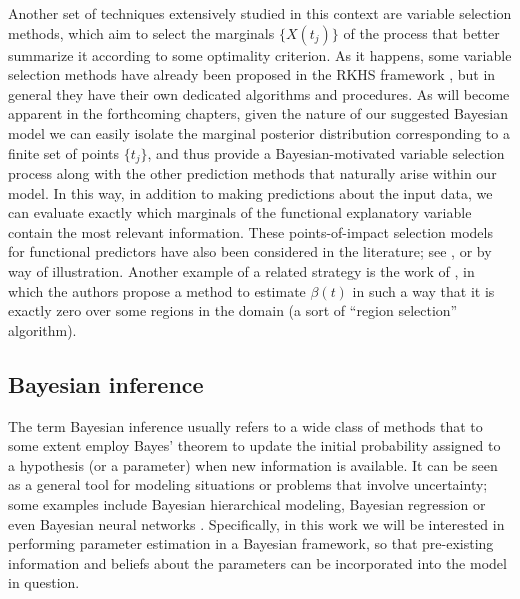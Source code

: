 Another set of techniques extensively studied in this context are variable selection methods, which aim to select the marginals \(\{X(t_j)\}\) of the process that better summarize it according to some optimality criterion. As it happens, some variable selection methods have already been proposed in the RKHS framework \citep[see for example][]{berrendero2019rkhs, bueno2019variable}, but in general they have their own dedicated algorithms and procedures. As will become apparent in the forthcoming chapters, given the nature of our suggested Bayesian model we can easily isolate the marginal posterior distribution corresponding to a finite set of points \(\{t_j\}\), and thus provide a Bayesian-motivated variable selection process along with the other prediction methods that naturally arise within our model. In this way, in addition to making predictions about the input data, we can evaluate exactly which marginals of the functional explanatory variable contain the most relevant information. These points-of-impact selection models for functional predictors have also been considered in the  literature; see \citet{poss2020superconsistent}, \citet{berrendero2016variable} or \citet{ferraty2010most} by way of illustration. Another example of a related strategy is the work of \citet{james2009functional}, in which the authors propose a method to estimate \(\beta(t)\) in such a way that it is exactly zero over some regions in the domain (a sort of ``region selection'' algorithm).


\subsection*{Bayesian inference}

The term Bayesian inference usually refers to a wide class of methods that to some extent employ Bayes' theorem to update the initial probability assigned to a hypothesis (or a parameter) when new information is available. It can be seen as a general tool for modeling situations or problems that involve uncertainty; some examples include Bayesian hierarchical modeling, Bayesian regression or even Bayesian neural networks \citep[see e.g.][]{murphy2012machine, bishop2006pattern}. Specifically, in this work we will be interested in performing parameter estimation in a Bayesian framework, so that pre-existing information and beliefs about the parameters can be incorporated into the model in question.

